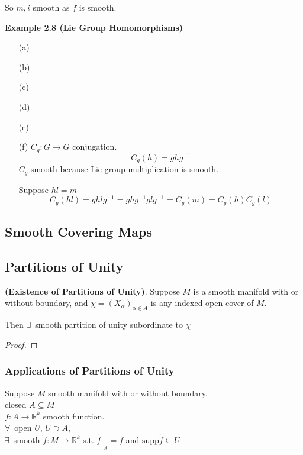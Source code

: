 So $m,i$ smooth as $f$ is smooth.  

\textbf{Example 2.8 (Lie Group Homomorphisms)}

\begin{enumerate}
\item[(a)]
\item[(b)]
\item[(c)]
\item[(d)]
\item[(e)]
\item[(f)] $C_g: G\to G$ conjugation.  
\[
C_g(h) = ghg^{-1}
\]
$C_g$ smooth because Lie group multiplication is smooth.  

Suppose $hl = m$
\[
C_g(hl) = ghlg^{-1} = ghg^{-1}g l g^{-1} = C_g(m) = C_g(h) C_g(l)
\]
\end{enumerate}

\subsection*{ Smooth Covering Maps }

\subsection*{ Partitions of Unity }

\begin{theorem}[2.23] \textbf{(Existence of Partitions of Unity)}.  Suppose $M$ is a smooth manifold with or without boundary, and $\chi = (X_{\alpha})_{\alpha \in A}$ is any indexed open cover of $M$.  

Then $\exists \,$ smooth partition of unity subordinate to $\chi$
\end{theorem}

\begin{proof}
  
\end{proof}


\subsubsection*{Applications of Partitions of Unity}


\begin{lemma}[2.26]
Suppose $M$ smooth manifold with or without boundary. \\
closed $A \subseteq M$ \\
$f:A \to \mathbb{R}^k$ smooth function. \\

$\forall \, $ open $U$, $U \supset A$, \\
\quad $\exists \, $ smooth $\widetilde{f} : M \to \mathbb{R}^k$ s.t. $\left. \widetilde{f}\right|_A = f$ and $\text{supp}{ \widetilde{f}}\subseteq U$
\end{lemma}


